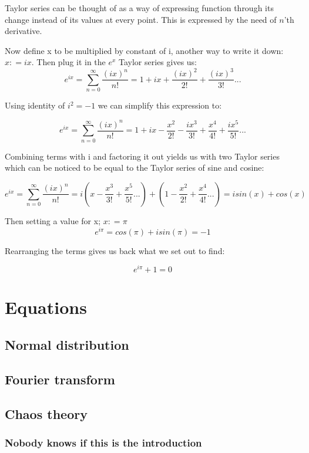 \documentclass[pdftex, 12pt, a4paper]{report}
\newcommand{\defeq}{\mathrel{\mathop:}=}
\begin{document}
	Taylor series can be thought of as a way of expressing function through its change instead of its values at every point. This is expressed by the need of $n$'th derivative. \newline
	
	Now define x to be multiplied by constant of i, another way to write it down: $x \defeq i x$. Then plug it in the $e^x$ Taylor series gives us:
		$$e^{ix }= \sum_{n=0}^{\infty} \frac{(ix)^n}{n!} = 1 + ix + \frac{(ix)^2}{2!} + \frac{(ix)^3}{3!}...$$
	
	Using identity of $i^2 = -1$ we can simplify this expression to:
	
		$$e^{ix} = \sum_{n=0}^{\infty} \frac{(ix)^n}{n!} = 1 + ix - \frac{x^2}{2!} - \frac{ix^3}{3!} + \frac{x^4}{4!} + \frac{ix^5}{5!}...$$
	
	Combining terms with i and factoring it out yields us with two Taylor series which can be noticed to be equal to the Taylor series of sine and cosine:
	
		$$e^{ix} = \sum_{n=0}^{\infty} \frac{(ix)^n}{n!} = i(x -  \frac{x^3}{3!} + \frac{x^5}{5!}...) +  (1 - \frac{x^2}{2!} + \frac{x^4}{4!} ...) = isin(x) + cos(x)$$
		
	Then setting a value for x; $x \defeq \pi$
		$$e^{i\pi} = cos(\pi) + isin(\pi) = -1$$
		
	Rearranging the terms gives us back what we set out to find:
		
		$$e^{i\pi} + 1 = 0$$
	
	\section{Equations}
	
	\subsection{Normal distribution}
	\subsection{Fourier transform}
	\subsection{Chaos theory}
	
	\subsubsection{Nobody knows if this is the introduction}
	
\end{document}
